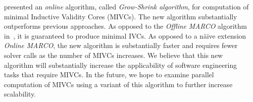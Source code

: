 presented an {\em online} algorithm, called {\em Grow-Shrink algorithm}, for computation of minimal Inductive Validity Cores (MIVCs). The new algorithm substantially outperforms previous approaches.  As opposed to the {\em Offline MARCO} algorithm in~\cite{Ghass17AllIVCs}, it is guaranteed to produce minimal IVCs.  As opposed to a n\"aive extension {\em Online MARCO}, the new algorithm is substantially faster and requires fewer solver calls as the number of MIVCs increases.  We believe that this new algorithm will substantially increase the applicability of software engineering tasks that require MIVCs.  In the future, we hope to examine parallel computation of MIVCs using a variant of this algorithm to further increase scalability.
